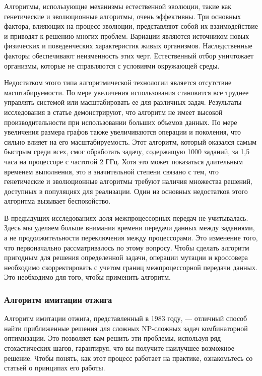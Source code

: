 Алгоритмы, использующие механизмы естественной эволюции, такие как генетические и эволюционные алгоритмы, очень эффективны. Три основных фактора, влияющих на процесс эволюции, представляют собой их взаимодействие и приводят к решению многих проблем. Вариации являются источником новых физических и поведенческих характеристик живых организмов. Наследственные факторы обеспечивают неизменность этих черт. Естественный отбор уничтожает организмы, которые не справляются с условиями окружающей среды.

Недостатком этого типа алгоритмической технологии является отсутствие масштабируемости. По мере увеличения использования становится все труднее управлять системой или масштабировать ее для различных задач. Результаты исследования в статье демонстрируют, что алгоритм не имеет высокой производительности при использовании больших объемов данных. По мере увеличения размера графов также увеличиваются операции и поколения, что сильно влияет на его масштабируемость. Этот алгоритм, который оказался самым быстрым среди всех, смог обработать задачу, содержащую 1000 заданий, за 1,5 часа на процессоре с частотой 2 ГГц. Хотя это может показаться длительным временем выполнения, это в значительной степени связано с тем, что генетические и эволюционные алгоритмы требуют наличия множества решений, доступных в популяциях для реализации. Один из основных недостатков этого алгоритма вызывает беспокойство.

В предыдущих исследованиях доля межпроцессорных передач не учитывалась. Здесь мы уделяем больше внимания времени передачи данных между заданиями, а не продолжительности переключения между процессорами. Это изменение того, что первоначально рассматривалось по этому вопросу. Чтобы сделать алгоритм пригодным для решения определенной задачи, операции мутации и кроссовера необходимо скорректировать с учетом границ межпроцессорной передачи данных. Это необходимо для того, чтобы применить алгоритм.

\subsubsection{Алгоритм имитации отжига}

Алгоритм имитации отжига, представленный в 1983 году, — отличный способ найти приближенные решения для сложных NP-сложных задач комбинаторной оптимизации. Это позволяет вам решить эти проблемы, используя ряд стохастических шагов, гарантируя, что вы получите наилучшее возможное решение. Чтобы понять, как этот процесс работает на практике, ознакомьтесь со статьей о принципах его работы.

